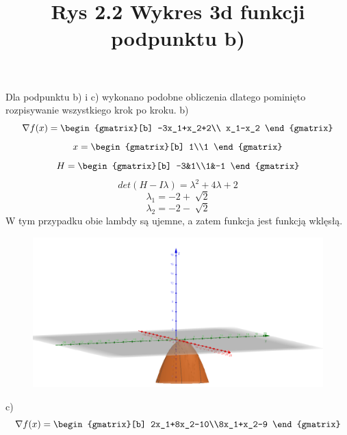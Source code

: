 \documentclass{article}
\begin{document}
Dla podpunktu b) i c) wykonano podobne obliczenia dlatego pominięto rozpisywanie wszystkiego krok po kroku.
b)
\begin{equation}
  \nabla f(x)=
  \begin{gmatrix}[b]
    -3x_1+x_2+2\\ x_1-x_2
  \end{gmatrix}
\end{equation}
\begin{equation}
  x=\begin{gmatrix}[b]
    1\\1
  \end{gmatrix}
\end{equation}
\begin{equation}
  H=\begin{gmatrix}[b]
    -3&1\\1&-1
  \end{gmatrix}
\end{equation}
\begin{equation}
  det(H-I\lambda)=\lambda^2+4\lambda+2
\end{equation}
\begin{equation}
  \lambda_1=-2+\sqrt[]{2}
\end{equation}
\begin{equation}
  \lambda_2=-2-\sqrt[]{2}
\end{equation}
W tym przypadku obie lambdy są ujemne, a zatem funkcja jest funkcją wklęsłą.
\begin{figure}[h]
  \includegraphics[scale=0.4]{Zadanie2b-wykres.png}
  \title{Rys 2.2 Wykres 3d funkcji podpunktu b)}
  \centering
\end{figure}
\newpage
c)
\begin{equation}
  \nabla f(x) =\begin{gmatrix}[b]
    2x_1+8x_2-10\\8x_1+x_2-9
  \end{gmatrix}
\end{equation}
\end{document}
